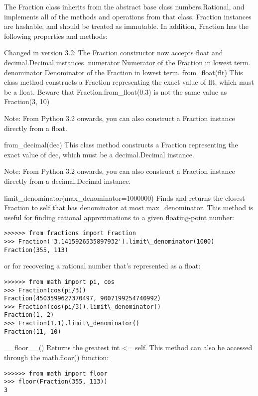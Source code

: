 The Fraction class inherits from the abstract base class numbers.Rational, and implements all of the methods and operations from that class. Fraction instances are hashable, and should be treated as immutable. In addition, Fraction has the following properties and methods:


Changed in version 3.2: The Fraction constructor now accepts float and decimal.Decimal instances.
numerator
Numerator of the Fraction in lowest term.
denominator
Denominator of the Fraction in lowest term.
from\_float(flt)
This class method constructs a Fraction representing the exact value of flt, which must be a float. Beware that Fraction.from\_float(0.3) is not the same value as Fraction(3, 10)

Note:
From Python 3.2 onwards, you can also construct a Fraction instance directly from a float.

from\_decimal(dec)
This class method constructs a Fraction representing the exact value of dec, which must be a decimal.Decimal instance.

Note:
From Python 3.2 onwards, you can also construct a Fraction instance directly from a decimal.Decimal instance.

limit\_denominator(max\_denominator=1000000)
Finds and returns the closest Fraction to self that has denominator at most max\_denominator. This method is useful for finding rational approximations to a given floating-point number:

\begin{lstlisting}
>>>>>> from fractions import Fraction
>>> Fraction('3.1415926535897932').limit\_denominator(1000)
Fraction(355, 113)
\end{lstlisting}

or for recovering a rational number that’s represented as a float:

\begin{lstlisting}
>>>>>> from math import pi, cos
>>> Fraction(cos(pi/3))
Fraction(4503599627370497, 9007199254740992)
>>> Fraction(cos(pi/3)).limit\_denominator()
Fraction(1, 2)
>>> Fraction(1.1).limit\_denominator()
Fraction(11, 10)
\end{lstlisting}

\_\_floor\_\_()
Returns the greatest int <= self. This method can also be accessed through the math.floor() function:

\begin{lstlisting}
>>>>>> from math import floor
>>> floor(Fraction(355, 113))
3
\end{lstlisting}

